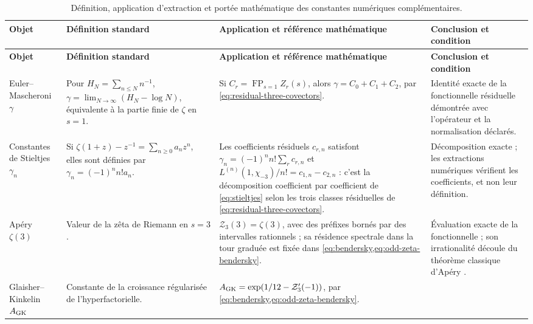 \begingroup
\small
\fontsize{10pt}{11.2pt}\selectfont
\setlength{\LTpre}{0.5\baselineskip}
\setlength{\LTpost}{0.5\baselineskip}
\begin{longtable}{@{}>{\raggedright\arraybackslash}p{}
                    >{\raggedright\arraybackslash}p{}
                    >{\raggedright\arraybackslash}p{}
                    >{\raggedright\arraybackslash}p{}@{}}
\caption{Définition, application d'extraction et portée mathématique des
constantes numériques complémentaires.}
\label{p3-83-c44-s1:tab:constantes-operadores-ontologia-rev11}\\
\toprule
\textbf{Objet} & \textbf{Définition standard} &
\textbf{Application et référence mathématique} & \textbf{Conclusion et condition}\\
\midrule
\endfirsthead
\toprule
\textbf{Objet} & \textbf{Définition standard} &
\textbf{Application et référence mathématique} & \textbf{Conclusion et condition}\\
\midrule
\endhead
Euler--Mascheroni \(\gamma\) &
Pour \(H_N=\sum_{n\leq N}n^{-1}\),
\(\gamma=\lim_{N\to\infty}(H_N-\log N)\), équivalente à la partie finie de
\(\zeta\) en \(s=1\). &
Si \(C_r=\operatorname*{FP}_{s=1}Z_r(s)\), alors
\(\gamma=C_0+C_1+C_2\), par
\eqref{eq:residual-three-covectors}. &
Identité exacte de la fonctionnelle résiduelle démontrée avec l'opérateur et la
normalisation déclarés.\\
Constantes de Stieltjes \(\gamma_n\) &
Si \(\zeta(1+z)-z^{-1}=\sum_{n\geq0}a_nz^n\), elles sont définies par
\(\gamma_n=(-1)^n n!a_n\). &
Les coefficients résiduels \(c_{r,n}\) satisfont
\(\gamma_n=(-1)^n n!\sum_r c_{r,n}\) et
\(L^{(n)}(1,\chi_{-3})/n!=c_{1,n}-c_{2,n}\) : c'est la décomposition
coefficient par coefficient de \eqref{eq:stieltjes} selon les trois classes
résiduelles de \eqref{eq:residual-three-covectors}. &
Décomposition exacte ; les extractions numériques vérifient les
coefficients, et non leur définition.\\
Ap\'ery \(\zeta(3)\) &
Valeur de la zêta de Riemann en \(s=3\). &
\(\mathcal Z_3(3)=\zeta(3)\), avec des préfixes bornés par des intervalles rationnels ;
sa résidence spectrale dans la tour graduée est fixée dans
\cref{eq:bendersky,eq:odd-zeta-bendersky}. &
Évaluation exacte de la fonctionnelle ; son irrationalité découle du théorème
classique d'Apéry \cite{Apery1979}.\\
Glaisher--Kinkelin \(A_{\rm GK}\) &
Constante de la croissance régularisée de l'hyperfactorielle. &
\(A_{\rm GK}=\exp(1/12-\mathcal Z_3'(-1))\), par \cref{eq:bendersky,eq:odd-zeta-bendersky}. &

\end{longtable}
